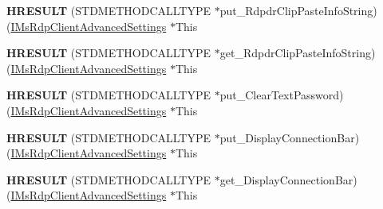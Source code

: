 \begin{DoxyCompactItemize}
\mbox{\label{struct_m_s_t_s_c_lib_1_1_i_ms_rdp_client_advanced_settings_vtbl_a902d999b39e400e17784a60b5212f9ff}} 
{\bfseries H\+R\+E\+S\+U\+LT} (S\+T\+D\+M\+E\+T\+H\+O\+D\+C\+A\+L\+L\+T\+Y\+PE $\ast$put\+\_\+\+Rdpdr\+Clip\+Paste\+Info\+String)(\hyperlink{interface_m_s_t_s_c_lib_1_1_i_ms_rdp_client_advanced_settings}{I\+Ms\+Rdp\+Client\+Advanced\+Settings} $\ast$This
\item 
\mbox{\label{struct_m_s_t_s_c_lib_1_1_i_ms_rdp_client_advanced_settings_vtbl_a41921ce32d627d72f43c173c933fcb14}} 
{\bfseries H\+R\+E\+S\+U\+LT} (S\+T\+D\+M\+E\+T\+H\+O\+D\+C\+A\+L\+L\+T\+Y\+PE $\ast$get\+\_\+\+Rdpdr\+Clip\+Paste\+Info\+String)(\hyperlink{interface_m_s_t_s_c_lib_1_1_i_ms_rdp_client_advanced_settings}{I\+Ms\+Rdp\+Client\+Advanced\+Settings} $\ast$This
\item 
\mbox{\label{struct_m_s_t_s_c_lib_1_1_i_ms_rdp_client_advanced_settings_vtbl_abb93ad408520b0e7853eb4044e4009f6}} 
{\bfseries H\+R\+E\+S\+U\+LT} (S\+T\+D\+M\+E\+T\+H\+O\+D\+C\+A\+L\+L\+T\+Y\+PE $\ast$put\+\_\+\+Clear\+Text\+Password)(\hyperlink{interface_m_s_t_s_c_lib_1_1_i_ms_rdp_client_advanced_settings}{I\+Ms\+Rdp\+Client\+Advanced\+Settings} $\ast$This
\item 
\mbox{\label{struct_m_s_t_s_c_lib_1_1_i_ms_rdp_client_advanced_settings_vtbl_ab7266ad408fb61e83218ad98c41d58b4}} 
{\bfseries H\+R\+E\+S\+U\+LT} (S\+T\+D\+M\+E\+T\+H\+O\+D\+C\+A\+L\+L\+T\+Y\+PE $\ast$put\+\_\+\+Display\+Connection\+Bar)(\hyperlink{interface_m_s_t_s_c_lib_1_1_i_ms_rdp_client_advanced_settings}{I\+Ms\+Rdp\+Client\+Advanced\+Settings} $\ast$This
\item 
\mbox{\label{struct_m_s_t_s_c_lib_1_1_i_ms_rdp_client_advanced_settings_vtbl_a61dfdb4836f4b61adc346e533a1481f5}} 
{\bfseries H\+R\+E\+S\+U\+LT} (S\+T\+D\+M\+E\+T\+H\+O\+D\+C\+A\+L\+L\+T\+Y\+PE $\ast$get\+\_\+\+Display\+Connection\+Bar)(\hyperlink{interface_m_s_t_s_c_lib_1_1_i_ms_rdp_client_advanced_settings}{I\+Ms\+Rdp\+Client\+Advanced\+Settings} $\ast$This
\item 

\end{DoxyCompactItemize}
